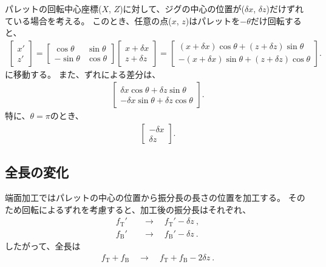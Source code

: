 

パレットの回転中心座標($X$, $Z$)に対して、ジグの中心の位置が($\delta x$, $\delta z$)だけずれている場合を考える。
このとき、任意の点($x$, $z$)はパレットを$-\theta$だけ回転すると、
\begin{align*}
  \left[
    \begin{array}{c}
      x'\\
      z'
    \end{array}
  \right]
  = \left[
    \begin{array}{cc}
      \cos\theta & \sin\theta\\
      -\sin\theta & \cos\theta
    \end{array}
  \right]\!\!
  \left[
    \begin{array}{c}
      x+\delta x\\
      z+\delta z
    \end{array}
  \right]
  = \left[
    \begin{array}{c}
      (x+\delta x)\cos\theta+(z+\delta z)\sin\theta\\
      -(x+\delta x)\sin\theta+(z+\delta z)\cos\theta
    \end{array}
  \right].
\end{align*}
に移動する。
また、ずれによる差分は、
\begin{align*}
  \left[
    \begin{array}{c}
      \delta x\cos\theta+\delta z\sin\theta\\
      -\delta x\sin\theta+\delta z\cos\theta
    \end{array}
  \right].
\end{align*}
特に、$\theta = \pi$のとき、
\begin{align*}
  \left[
    \begin{array}{c}
      -\delta x\\
      \delta z
    \end{array}
  \right].
\end{align*}


\subsection{全長の変化}
端面加工ではパレットの中心の位置から振分長の長さの位置を加工する。
そのため回転によるずれを考慮すると、加工後の振分長はそれぞれ、
\begin{align*}
  f_\mathrm T' &\quad\longrightarrow\quad f_\mathrm T'-\delta z\ ,\\
  f_\mathrm B' &\quad\longrightarrow\quad f_\mathrm B'-\delta z\ .
\end{align*}
したがって、全長は
\begin{align*}
  f_\mathrm T+f_\mathrm B \quad\longrightarrow\quad f_\mathrm T+f_\mathrm B-2\delta z\ .
\end{align*}


